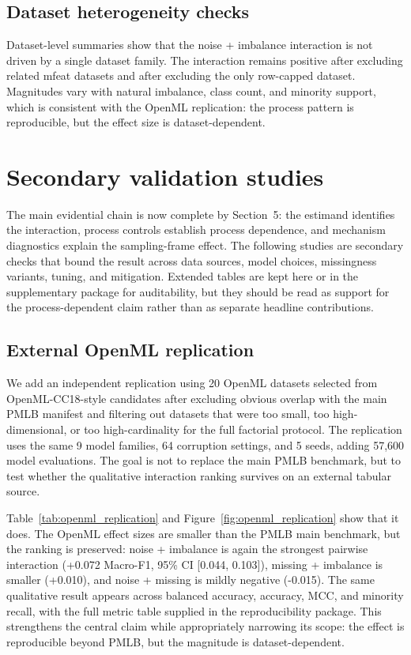 \documentclass[preprint,12pt,number]{elsarticle}
\begin{document}
\subsection{Dataset heterogeneity checks}

Dataset-level summaries show that the noise + imbalance interaction is not driven by a single dataset family. The interaction remains positive after excluding related mfeat datasets and after excluding the only row-capped dataset. Magnitudes vary with natural imbalance, class count, and minority support, which is consistent with the OpenML replication: the process pattern is reproducible, but the effect size is dataset-dependent.

\section{Secondary validation studies}

The main evidential chain is now complete by Section~5: the estimand identifies the interaction, process controls establish process dependence, and mechanism diagnostics explain the sampling-frame effect. The following studies are secondary checks that bound the result across data sources, model choices, missingness variants, tuning, and mitigation. Extended tables are kept here or in the supplementary package for auditability, but they should be read as support for the process-dependent claim rather than as separate headline contributions.

\subsection{External OpenML replication}
\label{sec:external_replication}

We add an independent replication using 20 OpenML datasets selected from OpenML-CC18-style candidates after excluding obvious overlap with the main PMLB manifest and filtering out datasets that were too small, too high-dimensional, or too high-cardinality for the full factorial protocol. The replication uses the same 9 model families, 64 corruption settings, and 5 seeds, adding 57,600 model evaluations. The goal is not to replace the main PMLB benchmark, but to test whether the qualitative interaction ranking survives on an external tabular source.

Table~\ref{tab:openml_replication} and Figure~\ref{fig:openml_replication} show that it does. The OpenML effect sizes are smaller than the PMLB main benchmark, but the ranking is preserved: noise + imbalance is again the strongest pairwise interaction (+0.072 Macro-F1, 95\% CI [0.044, 0.103]), missing + imbalance is smaller (+0.010), and noise + missing is mildly negative (-0.015). The same qualitative result appears across balanced accuracy, accuracy, MCC, and minority recall, with the full metric table supplied in the reproducibility package. This strengthens the central claim while appropriately narrowing its scope: the effect is reproducible beyond PMLB, but the magnitude is dataset-dependent.
\end{document}
